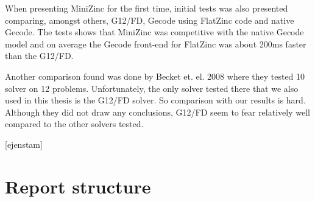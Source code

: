 When presenting MiniZinc for the first time, initial tests was also presented comparing, amongst others, G12/FD, Gecode using FlatZinc code and native Gecode. The tests shows that MiniZinc was competitive with the native Gecode model and on average the Gecode front-end for FlatZinc was about 200ms faster than the G12/FD.\cite{mz_paper}

Another comparison found was done by Becket et. el. 2008 where they tested 10 solver on 12 problems. Unfortunately, the only solver tested there that we also used in this thesis is the G12/FD solver. So comparison with our results is hard. Although they did not draw any conclusions, G12/FD seem to fear relatively well compared to the other solvers tested.\cite{nicta_2964}


[ejenstam]\cite{ejenstam_2014}


\section{Report structure}
